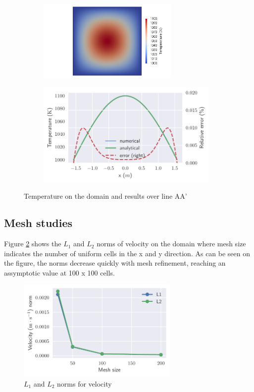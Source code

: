 \begin{figure}[htbp]
    \centering
    \begin{subfigure}[b]{0.42\textwidth}
        \includegraphics[width=68mm, trim={18cm 0 0 0}, clip]{3_results_and_discussion/figures/T.png}
    \end{subfigure}
    \begin{subfigure}[b]{0.56\textwidth}
        \includegraphics[width=88mm]{3_results_and_discussion/figures/temperature.pdf}
    \end{subfigure}
    \caption{Temperature on the domain and results over line AA'}
    \label{fig:T}
\end{figure}

\subsection{Mesh studies}

Figure \ref{fig:normsU} shows the $ L_{1} $ and $ L_{2} $ norms of velocity on the domain where mesh size indicates the number of uniform cells in the x and y direction.
As can be seen on the figure, the norms decrease quickly with mesh refinement, reaching an assymptotic value at 100 x 100 cells.

\begin{figure}[htbp]
    \centering
    \includegraphics[width=78mm]{3_results_and_discussion/figures/normsU.pdf}
    \caption{$ L_{1} $ and $ L_{2} $ norms for velocity}
    \label{fig:normsU}
\end{figure}

